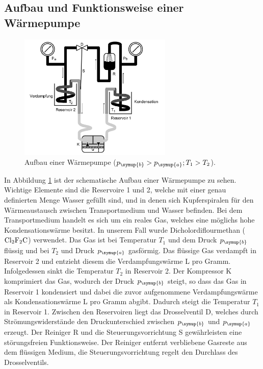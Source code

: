   \subsection{Aufbau und Funktionsweise einer Wärmepumpe}
  \begin{figure}
    \centering
    \includegraphics[width=0.65\textwidth]{aufbau_waermepumpe.png}
    \caption{Aufbau einer Wärmepumpe ($p_\symup{b} > p_\symup{a}; T_1 > T_2$).}
    \label{fig:aufbau}
  \end{figure}
  In Abbildung \ref{fig:aufbau} ist der schematische Aufbau einer Wärmepumpe zu
  sehen. Wichtige Elemente sind die Reservoire 1 und 2, welche mit einer genau
  definierten Menge Wasser gefüllt sind, und in denen sich Kupferspiralen für den
  Wärmeaustausch zwischen Transportmedium und Wasser befinden. Bei dem Transportmedium
  handelt es sich um ein reales Gas, welches eine möglichs hohe Kondensationswärme
  besitzt. In unserem Fall wurde Dicholordiflourmethan ($\ce{Cl2F2C}$) verwendet.
  Das Gas ist bei Temperatur $T_1$ und dem Druck $p_\symup{b}$ flüssig und bei
  $T_2$ und Druck $p_\symup{a}$ gasförmig. Das flüssige Gas verdampft in Reservoir
  2 und entzieht diesem die Verdampfungswärme L pro Gramm. Infolgedessen sinkt die
  Temperatur $T_2$ in Reservoir 2.
  Der Kompressor K komprimiert das Gas, wodurch der Druck $p_\symup{b}$ steigt,
  so dass das Gas in Reservoir 1 kondensiert und dabei die zuvor aufgenommene
  Verdampfungswärme als Kondensationswärme L pro Gramm abgibt. Dadurch steigt die
  Temperatur $T_1$ in Reservoir 1.
  Zwischen den Reservoiren liegt das Drosselventil D, welches durch Strömungswiderstände
  den Druckunterschied zwischen $p_\symup{b}$ und $p_\symup{a}$ erzeugt.
  Der Reiniger R und die Steuerungsvorrichtung S gewährleisten eine störungsfreien
  Funktionsweise. Der Reiniger entfernt verbliebene Gasreste aus dem flüssigen
  Medium, die Steuerungsvorrichtung regelt den Durchlass des Drosselventils.

